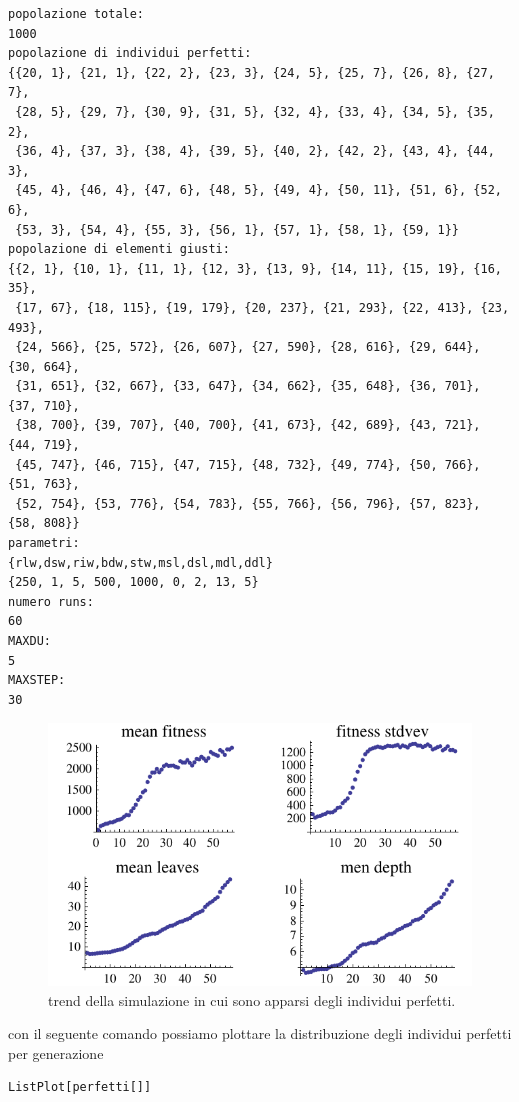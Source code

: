 \documentclass[12pt, a4paper]{article}
\begin{document}
\begin{lstlisting}
popolazione totale:
1000
popolazione di individui perfetti:
{{20, 1}, {21, 1}, {22, 2}, {23, 3}, {24, 5}, {25, 7}, {26, 8}, {27, 7}, 
 {28, 5}, {29, 7}, {30, 9}, {31, 5}, {32, 4}, {33, 4}, {34, 5}, {35, 2}, 
 {36, 4}, {37, 3}, {38, 4}, {39, 5}, {40, 2}, {42, 2}, {43, 4}, {44, 3}, 
 {45, 4}, {46, 4}, {47, 6}, {48, 5}, {49, 4}, {50, 11}, {51, 6}, {52, 6}, 
 {53, 3}, {54, 4}, {55, 3}, {56, 1}, {57, 1}, {58, 1}, {59, 1}}
popolazione di elementi giusti:
{{2, 1}, {10, 1}, {11, 1}, {12, 3}, {13, 9}, {14, 11}, {15, 19}, {16, 35}, 
 {17, 67}, {18, 115}, {19, 179}, {20, 237}, {21, 293}, {22, 413}, {23, 493}, 
 {24, 566}, {25, 572}, {26, 607}, {27, 590}, {28, 616}, {29, 644}, {30, 664}, 
 {31, 651}, {32, 667}, {33, 647}, {34, 662}, {35, 648}, {36, 701}, {37, 710}, 
 {38, 700}, {39, 707}, {40, 700}, {41, 673}, {42, 689}, {43, 721}, {44, 719}, 
 {45, 747}, {46, 715}, {47, 715}, {48, 732}, {49, 774}, {50, 766}, {51, 763}, 
 {52, 754}, {53, 776}, {54, 783}, {55, 766}, {56, 796}, {57, 823}, {58, 808}}
parametri:
{rlw,dsw,riw,bdw,stw,msl,dsl,mdl,ddl}
{250, 1, 5, 500, 1000, 0, 2, 13, 5}
numero runs:
60
MAXDU:
5
MAXSTEP:
30

\end{lstlisting}

\begin{figure}[!h]
\begin{center}
\includegraphics[width=12.0cm]{expr10_run1.pdf}
\caption{trend della simulazione in cui sono apparsi degli individui perfetti.} 
\label{figure:expr10run1}
\end{center}
\end{figure}

con il seguente comando possiamo plottare la distribuzione degli individui perfetti per generazione
\begin{lstlisting}
ListPlot[perfetti[]]
\end{lstlisting}
\end{document}

